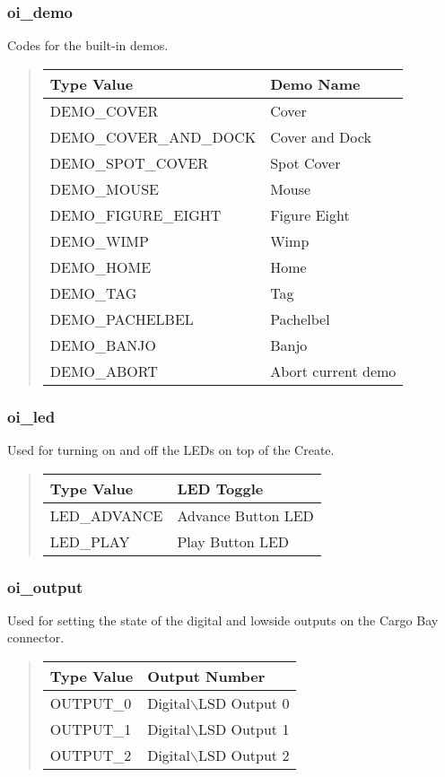 \documentclass {article}
\begin{document}
\subsubsection {oi\_demo} \hypertarget{oidemo}{} Codes for the
built-in demos.
\begin {quote}
  \begin {tabular}{l|l}
    {\sf Type Value} & {\sf Demo Name} \\
    \hline
    DEMO\_COVER & Cover \\
    DEMO\_COVER\_AND\_DOCK & Cover and Dock \\
    DEMO\_SPOT\_COVER & Spot Cover \\
    DEMO\_MOUSE & Mouse \\
    DEMO\_FIGURE\_EIGHT & Figure Eight \\
    DEMO\_WIMP & Wimp \\
    DEMO\_HOME & Home \\
    DEMO\_TAG & Tag \\
    DEMO\_PACHELBEL & Pachelbel \\
    DEMO\_BANJO & Banjo \\
    DEMO\_ABORT & Abort current demo \\
  \end {tabular}
\end {quote}

\subsubsection {oi\_led} \hypertarget{oiled}{} Used for turning on and
off the LEDs on top of the Create.
\begin {quote}
  \begin {tabular}{l|l}
    {\sf Type Value} & {\sf LED Toggle} \\
    \hline
    LED\_ADVANCE & Advance Button LED \\
    LED\_PLAY & Play Button LED \\
  \end {tabular}
\end{quote}

\subsubsection {oi\_output} \hypertarget{oioutput}{} Used for setting
the state of the digital and lowside outputs on the Cargo Bay
connector.
\begin {quote}
  \begin {tabular}{l|l}
    {\sf Type Value} & {\sf Output Number} \\
    \hline
    OUTPUT\_0 & Digital$\backslash$LSD Output 0 \\
    OUTPUT\_1 & Digital$\backslash$LSD Output 1 \\
    OUTPUT\_2 & Digital$\backslash$LSD Output 2 \\
  \end {tabular}
\end {quote}
\end{document}
